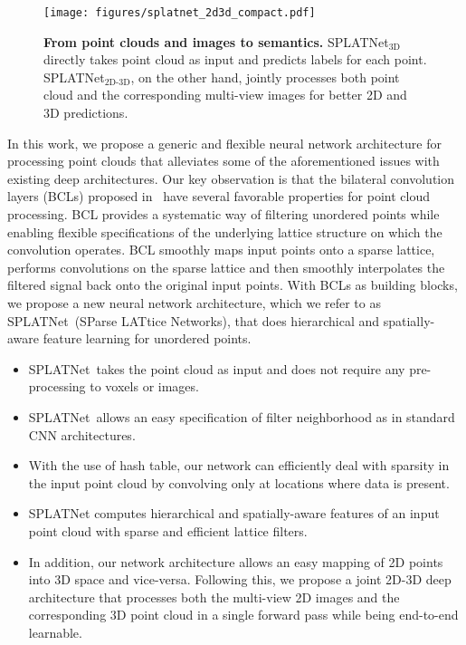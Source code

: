 \documentclass[10pt,twocolumn,letterpaper]{article}
\newcommand{\mycaption}[2]{\caption{\textbf{#1.}\xspace#2}}
\def\model{SPLATNet\xspace}
\newcommand{\camreadycomment}[1]{{\textcolor{red}{#1}}}
\begin{document}
\begin{figure}
\begin{center}
\centerline{\texttt{[image: figures/splatnet\_2d3d\_compact.pdf]}}
  \vspace{-0.2cm}
  \mycaption{From point clouds and images to semantics}{SPLATNet$_{\text{3D}}$ directly takes point cloud
  as input and predicts labels for each point. SPLATNet$_{\text{2D-3D}}$, on the other hand, jointly processes
  both point cloud and the corresponding multi-view images for better 2D and 3D predictions.}
  \label{fig:teaser}
\end{center}
\vspace{-0.8cm}
\end{figure}%
In this work, we propose a generic and flexible neural network architecture for processing point clouds
that alleviates some of the aforementioned issues with existing deep architectures.
Our key observation is that the bilateral convolution layers (BCLs) proposed in~\cite{jampani2016learning,kiefel:iclr:2015} have several favorable properties
for point cloud processing. BCL provides a systematic way of filtering unordered points while enabling 
flexible specifications of the underlying lattice structure
on which the convolution operates.
BCL smoothly maps input points onto a sparse lattice, performs 
convolutions on the sparse lattice
and then smoothly interpolates the filtered signal back onto the original input points.
With BCLs as building blocks, we propose a new neural network architecture,
which we refer to as \model~(SParse LATtice Networks), that does hierarchical and spatially-aware feature learning for unordered points.
\vspace{-1mm}\begin{itemize}
    \setlength\itemsep{0em}
    \item \model~takes the point cloud as input and does not require any pre-processing to voxels or images.
    \item \model~allows an easy specification of filter neighborhood as in standard CNN architectures.
    \item With the use of hash table, our network can efficiently deal with sparsity in the input point cloud by convolving  only at locations where data is present.
    \item SPLATNet computes hierarchical and spatially-aware features of an input point cloud with sparse
    and efficient lattice filters.
    \item In addition, our network architecture allows an easy mapping of 2D points into 3D space and vice-versa. Following this,
    we propose a joint 2D-3D deep architecture that processes both the multi-view 2D images and the corresponding 3D point cloud in a single forward pass while being end-to-end learnable.
\end{itemize}\vspace{-1mm}%
\end{document}
